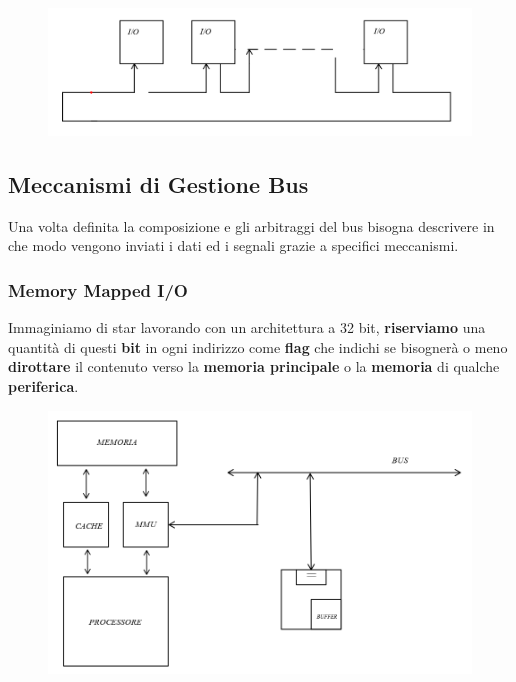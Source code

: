 \documentclass{article}
\begin{document}
\begin{enumerate}
\begin{figure}[htbp]
        \center
        \includegraphics[scale=0.325]{img/token_passing.png}
    \end{figure}
\end{enumerate}

\vspace*{10px}

\newpage

\subsection{Meccanismi di Gestione Bus}

Una volta definita la composizione e gli arbitraggi del bus bisogna descrivere in che modo vengono inviati i dati ed i segnali grazie a specifici meccanismi.

\subsubsection{Memory Mapped I/O}

Immaginiamo di star lavorando con un architettura a 32 bit, \textbf{riserviamo} una quantità di questi \textbf{bit} in ogni indirizzo come \textbf{flag} che indichi se bisognerà o meno \textbf{dirottare} il contenuto verso la \textbf{memoria principale} o la \textbf{memoria} di qualche \textbf{periferica}.

\vspace*{10px}

    \begin{figure}[htbp]
        \center
        \includegraphics[scale=0.45]{img/memory_mapped_io.png}
    \end{figure}
\end{document}
